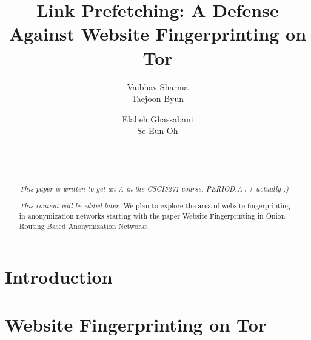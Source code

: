 \documentclass{sig-alternate-05-2015}
\begin{document}
\title{Link Prefetching: A Defense Against Website Fingerprinting on Tor }

\author{
    \alignauthor
        Vaibhav Sharma\\%
    \alignauthor
        Taejoon Byun\\
\and
    \alignauthor
        Elaheh Ghassabani\\
    \alignauthor
        Se Eun Oh\\%
\and
      \\
           \\
}

\maketitle
\begin{abstract}
\emph{This paper is written to get an A in the CSCI5271 course.
PERIOD.A++ actually ;)}

\emph{This content will be edited later.} We plan to explore the area of website fingerprinting in anonymization networks starting with the paper Website Fingerprinting in Onion Routing Based Anonymization Networks.
\end{abstract}



\section{Introduction}


\section{Website Fingerprinting on Tor}

\end{document}
